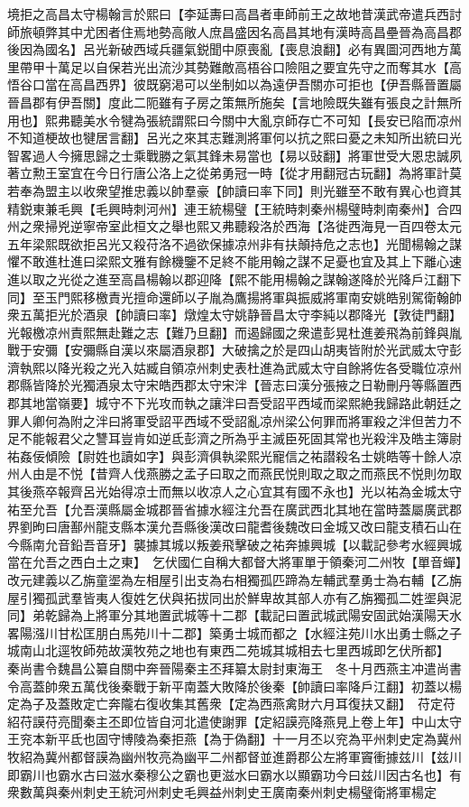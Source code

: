 境拒之高昌太守楊翰言於熙曰【李延夀曰高昌者車師前王之故地昔漢武帝遣兵西討師旅頓弊其中尤困者住焉地勢高敞人庶昌盛因名高昌其地有漢時高昌壘晉為高昌郡後因為國名】呂光新破西域兵疆氣鋭聞中原喪亂【喪息浪翻】必有異圖河西地方萬里帶甲十萬足以自保若光出流沙其勢難敵高梧谷口險阻之要宜先守之而奪其水【高悟谷口當在高昌西界】彼既窮渇可以坐制如以為遠伊吾關亦可拒也【伊吾縣晉置屬晉昌郡有伊吾關】度此二阨雖有子房之策無所施矣【言地險既失雖有張良之計無所用也】熙弗聽美水令犍為張統謂熙曰今關中大亂京師存亡不可知【長安已陷而凉州不知道梗故也犍居言翻】呂光之來其志難測將軍何以抗之熙曰憂之未知所出統曰光智畧過人今擁思歸之士乘戰勝之氣其鋒未易當也【易以䜴翻】將軍世受大恩忠誠夙著立勲王室宜在今日行唐公洛上之從弟勇冠一時【從才用翻冠古玩翻】為將軍計莫若奉為盟主以收衆望推忠義以帥羣豪【帥讀曰率下同】則光雖至不敢有異心也資其精鋭東兼毛興【毛興時刺河州】連王統楊璧【王統時刺秦州楊璧時刺南秦州】合四州之衆掃兇逆寧帝室此桓文之舉也熙又弗聽殺洛於西海【洛徙西海見一百四卷太元五年梁熙既欲拒呂光又殺苻洛不過欲保據凉州非有扶顛持危之志也】光聞楊翰之謀懼不敢進杜進曰梁熙文雅有餘機鑒不足終不能用翰之謀不足憂也宜及其上下離心速進以取之光從之進至高昌楊翰以郡迎降【熙不能用楊翰之謀翰遂降於光降戶江翻下同】至玉門熙移檄責光擅命還師以子胤為鷹揚將軍與振威將軍南安姚皓别駕衛翰帥衆五萬拒光於酒泉【帥讀曰率】燉煌太守姚静晉昌太守李純以郡降光【敦徒門翻】光報檄凉州責熙無赴難之志【難乃旦翻】而遏歸國之衆遣彭晃杜進姜飛為前鋒與胤戰于安彌【安彌縣自漢以來屬酒泉郡】大破擒之於是四山胡夷皆附於光武威太守彭濟執熙以降光殺之光入姑臧自領凉州刺史表杜進為武威太守自餘將佐各受職位凉州郡縣皆降於光獨酒泉太守宋皓西郡太守宋泮【晉志曰漢分張掖之日勒刪丹等縣置西郡其地當嶺要】城守不下光攻而執之讓泮曰吾受詔平西域而梁熙絶我歸路此朝廷之罪人卿何為附之泮曰將軍受詔平西域不受詔亂凉州梁公何罪而將軍殺之泮但苦力不足不能報君父之讐耳豈肯如逆氐彭濟之所為乎主滅臣死固其常也光殺泮及皓主簿尉祐姦佞傾險【尉姓也讀如字】與彭濟俱執梁熙光寵信之祐譛殺名士姚皓等十餘人凉州人由是不悦【昔齊人伐燕勝之孟子曰取之而燕民悦則取之取之而燕民不悦則勿取其後燕卒報齊呂光始得凉士而無以收凉人之心宜其有國不永也】光以祐為金城太守祐至允吾【允吾漢縣屬金城郡晉省據水經注允吾在廣武西北其地在當時蓋屬廣武郡界劉昫曰唐鄯州龍支縣本漢允吾縣後漢改曰龍耆後魏改曰金城又改曰龍支積石山在今縣南允音鉛吾音牙】襲據其城以叛姜飛擊破之祐奔據興城【以載記參考水經興城當在允吾之西白土之東】　乞伏國仁自稱大都督大將軍單于領秦河二州牧【單音蟬】改元建義以乙旃童埿為左相屋引出支為右相獨孤匹蹄為左輔武羣勇士為右輔【乙旃屋引獨孤武羣皆夷人復姓乞伏與拓拔同出於鮮卑故其部人亦有乙旃獨孤二姓埿與泥同】弟乾歸為上將軍分其地置武城等十二郡【載記曰置武城武陽安固武始漢陽天水畧陽漒川甘松匡朋白馬苑川十二郡】築勇士城而都之【水經注苑川水出勇士縣之子城南山北逕牧師苑故漢牧苑之地也有東西二苑城其城相去七里西城即乞伏所都】　秦尚書令魏昌公纂自關中奔晉陽秦主丕拜纂太尉封東海王　冬十月西燕主冲遣尚書令高蓋帥衆五萬伐後秦戰于新平南蓋大敗降於後秦【帥讀曰率降戶江翻】初蓋以楊定為子及蓋敗定亡奔隴右復收集其舊衆【定為西燕禽財六月耳復扶又翻】　苻定苻紹苻謨苻亮聞秦主丕即位皆自河北遣使謝罪【定紹謨亮降燕見上卷上年】中山太守王兖本新平氐也固守博陵為秦拒燕【為于偽翻】十一月丕以兖為平州刺史定為冀州牧紹為冀州都督謨為幽州牧亮為幽平二州都督並進爵郡公左將軍竇衝據兹川【兹川即霸川也霸水古曰滋水秦穆公之霸也更滋水曰霸水以顯霸功今曰兹川因古名也】有衆數萬與秦州刺史王統河州刺史毛興益州刺史王廣南秦州刺史楊璧衛將軍楊定